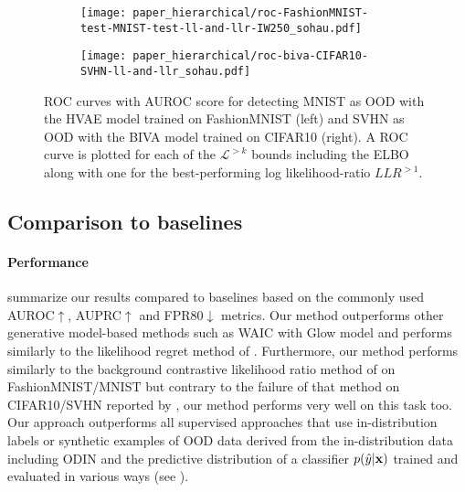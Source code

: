 {\begin{figure}
    \centering
    \begin{subfigure}[l]{0.495\columnwidth}
        \texttt{[image: paper\_hierarchical/roc-FashionMNIST-test-MNIST-test-ll-and-llr-IW250\_sohau.pdf]}
    \end{subfigure}
    \hfill
    \begin{subfigure}[r]{0.495\columnwidth}
        \texttt{[image: paper\_hierarchical/roc-biva-CIFAR10-SVHN-ll-and-llr\_sohau.pdf]}
    \end{subfigure}
    \caption[ROC curves for out of distribution detection (MNIST/FashionMNIST and SVHN/CIFAR10).]{%
        ROC curves with AUROC score for detecting MNIST as OOD with the HVAE model trained on FashionMNIST (left) and SVHN as OOD with the BIVA model trained on CIFAR10 (right). 
        A ROC curve is plotted for each of the $\mathcal{L}^{>k}$ bounds including the ELBO along with one for the best-performing log likelihood-ratio $LLR^{>1}$.
    }
    \label{fig_hierarchical:FMNIST-roc-llr and CIFAR10-roc-llr}
\end{figure}


\subsection{Comparison to baselines}
\paragraph{Performance}  summarize our results compared to baselines based on the commonly used AUROC$\uparrow$, AUPRC$\uparrow$ and FPR80$\downarrow$ metrics.
Our method outperforms other generative model-based methods such as WAIC \parencite{choi_waic_2019} with Glow model and performs similarly to the likelihood regret method of \parencite{xiao_likelihood_2020}.
Furthermore, our method performs similarly to the background contrastive likelihood ratio method of \textcite{ren_likelihood_2019} on FashionMNIST/MNIST but contrary to the failure of that method on CIFAR10/SVHN reported by \parencite{xiao_likelihood_2020}, our method performs very well on this task too.
Our approach outperforms all supervised approaches that use in-distribution labels or synthetic examples of OOD data derived from the in-distribution data including ODIN \parencite{liang_enhancing_2018} and the predictive distribution of a classifier $p(\hat{y}|{\mathbf{x}})$ trained and evaluated in various ways (see \textcite{ren_likelihood_2019}).

}
